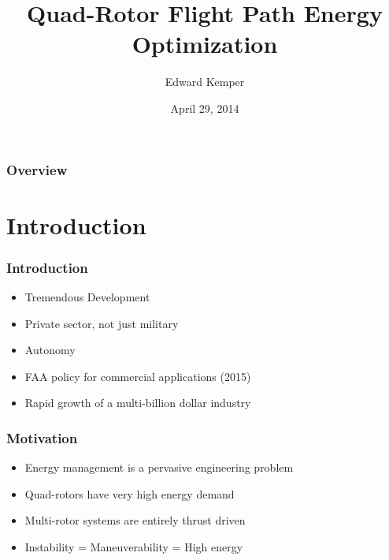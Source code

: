 \documentclass{beamer}
\title[Path-Energy Optimization]{Quad-Rotor Flight Path Energy Optimization}
\author{Edward Kemper} %
\institute[Northern Arizona University] 
{
Northern Arizona University \\ %
\medskip
\textit{edwardkemper@gmail.com} %
}
\date{April 29, 2014}
\begin{document}
\begin{frame}
\titlepage %
\end{frame}



\begin{frame}
\frametitle{Overview} 
\tableofcontents 
\end{frame}


\section{Introduction} 

\begin{frame}
\frametitle{Introduction}
\begin{itemize}
\item Tremendous Development
\item Private sector, not just military 
\item Autonomy
\item FAA policy for commercial applications (2015)
\item Rapid growth of a multi-billion dollar industry
\end{itemize}
\end{frame}



\begin{frame}
\frametitle{Motivation}
\begin{itemize}
\item Energy management is a pervasive engineering problem
\item Quad-rotors have very high energy demand
\item Multi-rotor systems are entirely thrust driven
\item Instability = Maneuverability = High energy

\end{itemize}
\end{frame}
\end{document}
